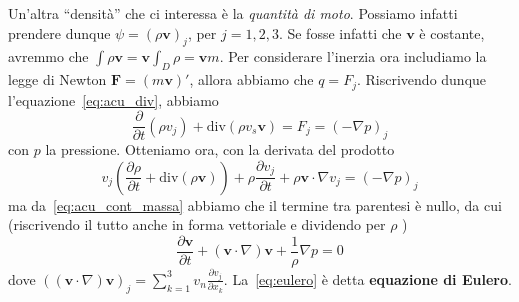Un'altra ``densità'' che ci interessa è la \emph{quantità di moto}. Possiamo
infatti prendere dunque \(\psi = {(\rho \mathbf{v} )}_j\), per \(j=1,2,3\). Se fosse infatti che
\(\mathbf{v} \) è costante, avremmo che \(\int \rho \mathbf{v}  = \mathbf{v}
\int _D \rho = \mathbf{v} m\). Per considerare l'inerzia ora includiamo la legge
di Newton \(\mathbf{F} = {(m\mathbf{v} )}'\), allora abbiamo che \(q = F_j\).
Riscrivendo dunque l'equazione~\eqref{eq:acu_div}, abbiamo
\[
  \frac{\partial }{\partial t}{(\rho v_j)} + \mathrm{div}{(\rho v_s \mathbf{v}
  )} = F_j = {(-\nabla p)}_j
\]
con \(p\) la pressione. Otteniamo ora, con la derivata del prodotto
\[
  v_j {\left( \frac{\partial \rho}{\partial t} +  \mathrm{div}{(\rho \mathbf{v}
  )}\right)} + \rho \frac{\partial v_j}{\partial t} + \rho \mathbf{v} \cdot
  \nabla v_j = {(-\nabla p)}_j
\]
ma da~\eqref{eq:acu_cont_massa} abbiamo che il termine tra parentesi è nullo, da
cui (riscrivendo il tutto anche in forma vettoriale e dividendo per \(\rho\) )
\begin{equation}\label{eq:eulero}
  \frac{\partial \mathbf{v} }{\partial t} + {(\mathbf{v} \cdot \nabla )}
  \mathbf{v} + \frac{1}{\rho} \nabla p = 0
\end{equation}
dove \({\left( {(\mathbf{v} \cdot \nabla )}\mathbf{v}  \right)}_j =
\sum_{k=1}^{3} v_{n} \frac{\partial v_j}{\partial x_k}  \). La~\eqref{eq:eulero}
è detta \textbf{equazione di Eulero}.

